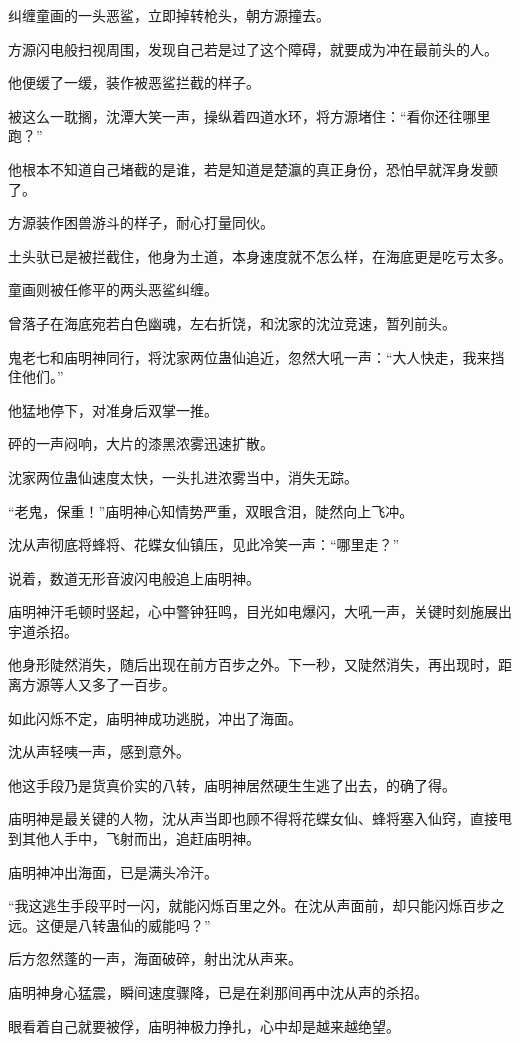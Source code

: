 \begin{this_body}
纠缠童画的一头恶鲨，立即掉转枪头，朝方源撞去。

方源闪电般扫视周围，发现自己若是过了这个障碍，就要成为冲在最前头的人。

他便缓了一缓，装作被恶鲨拦截的样子。

被这么一耽搁，沈潭大笑一声，操纵着四道水环，将方源堵住：“看你还往哪里跑？”

他根本不知道自己堵截的是谁，若是知道是楚瀛的真正身份，恐怕早就浑身发颤了。

方源装作困兽游斗的样子，耐心打量同伙。

土头驮已是被拦截住，他身为土道，本身速度就不怎么样，在海底更是吃亏太多。

童画则被任修平的两头恶鲨纠缠。

曾落子在海底宛若白色幽魂，左右折饶，和沈家的沈泣竞速，暂列前头。

鬼老七和庙明神同行，将沈家两位蛊仙追近，忽然大吼一声：“大人快走，我来挡住他们。”

他猛地停下，对准身后双掌一推。

砰的一声闷响，大片的漆黑浓雾迅速扩散。

沈家两位蛊仙速度太快，一头扎进浓雾当中，消失无踪。

“老鬼，保重！”庙明神心知情势严重，双眼含泪，陡然向上飞冲。

沈从声彻底将蜂将、花蝶女仙镇压，见此冷笑一声：“哪里走？”

说着，数道无形音波闪电般追上庙明神。

庙明神汗毛顿时竖起，心中警钟狂鸣，目光如电爆闪，大吼一声，关键时刻施展出宇道杀招。

他身形陡然消失，随后出现在前方百步之外。下一秒，又陡然消失，再出现时，距离方源等人又多了一百步。

如此闪烁不定，庙明神成功逃脱，冲出了海面。

沈从声轻咦一声，感到意外。

他这手段乃是货真价实的八转，庙明神居然硬生生逃了出去，的确了得。

庙明神是最关键的人物，沈从声当即也顾不得将花蝶女仙、蜂将塞入仙窍，直接甩到其他人手中，飞射而出，追赶庙明神。

庙明神冲出海面，已是满头冷汗。

“我这逃生手段平时一闪，就能闪烁百里之外。在沈从声面前，却只能闪烁百步之远。这便是八转蛊仙的威能吗？”

后方忽然蓬的一声，海面破碎，射出沈从声来。

庙明神身心猛震，瞬间速度骤降，已是在刹那间再中沈从声的杀招。

眼看着自己就要被俘，庙明神极力挣扎，心中却是越来越绝望。


\end{this_body}
